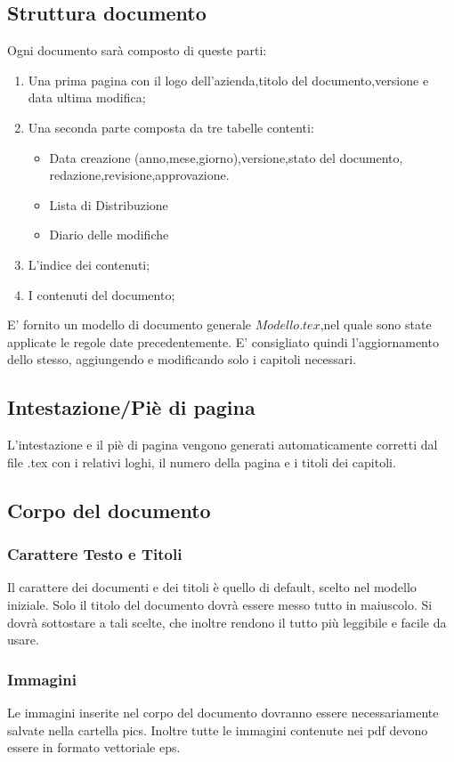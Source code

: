 \documentclass[11pt,titlepage,a4paper]{report}
\begin{document}
\subsection{Struttura documento}
Ogni documento sar\`a composto di queste parti:
\begin{enumerate}
\item Una prima pagina con il logo dell'azienda,titolo del documento,versione e data ultima modifica;
\item Una seconda parte composta da tre tabelle contenti:
	{\begin{itemize}
	\item Data creazione (anno,mese,giorno),versione,stato del documento,\\
			redazione,revisione,approvazione.
	\item Lista di Distribuzione
	\item Diario delle modifiche 
	\end{itemize}}
\item L'indice dei contenuti;
\item I contenuti del documento;
\end{enumerate}
E' fornito un modello di documento generale \( Modello.tex\),nel quale sono state applicate le regole date precedentemente. E' consigliato quindi l'aggiornamento dello stesso, aggiungendo e modificando solo i capitoli necessari.
\subsection{Intestazione/Pi\`e di pagina}
L'intestazione e il pi\`e di pagina vengono generati automaticamente corretti dal file .tex con i relativi loghi, il numero della pagina e i titoli dei capitoli.
\subsection{Corpo del documento}
\subsubsection{Carattere Testo e Titoli}
Il carattere dei documenti e dei titoli \`e quello di default, scelto nel modello iniziale. Solo il titolo del documento dovr\`a essere messo tutto in maiuscolo. Si dovr\`a sottostare a tali scelte, che inoltre rendono il tutto pi\`u leggibile e facile da usare. 
\subsubsection{Immagini}
Le immagini inserite nel corpo del documento dovranno essere necessariamente salvate nella cartella pics. Inoltre tutte le immagini contenute nei pdf devono essere in formato vettoriale eps.
\end{document}
